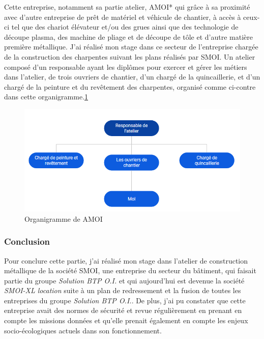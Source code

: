 Cette entreprise, notamment sa partie atelier, \acrshort{AMOI}* qui grâce à sa proximité avec d'autre entreprise de prêt de matériel et véhicule de chantier, à accès à ceux-ci tel que des chariot élévateur et/ou des grues ainsi que des technologie de découpe plasma, des machine de pliage et de découpe de tôle et d'autre matière première métallique.\newline
J'ai réalisé mon stage dans ce secteur de l'entreprise chargée de la construction des charpentes suivant les plans réalisés par SMOI. Un atelier composé d'un responsable ayant les diplômes pour exercer et gérer les métiers dans l'atelier, de trois ouvriers de chantier, d'un chargé de la quincaillerie, et d'un chargé de la peinture et du revêtement des charpentes, organisé comme ci-contre dans cette organigramme.\ref{fig:organigram_AMOI}
\begin{figure}[h!]
    \centering
    \includegraphics[width=1\linewidth]{figures/organigram_AMOI.png}
    \caption{Organigramme de AMOI}
    \label{fig:organigram_AMOI}
\end{figure} \newline


\subsubsection{Conclusion}

Pour conclure cette partie, j'ai réalisé mon stage dans l'atelier de construction métallique de la société SMOI, une entreprise du secteur du bâtiment, qui faisait partie du groupe \textit{Solution BTP O.I.} et qui aujourd'hui est devenue la société \textit{SMOI-XL location} suite à un plan de redressement et la fusion de toutes les entreprises du groupe \textit{Solution BTP O.I.}. De plus, j'ai pu constater que cette entreprise avait des normes de sécurité et revue régulièrement en prenant en compte les missions données et qu'elle prenait également en compte les enjeux socio-écologiques actuels dans son fonctionnement.
